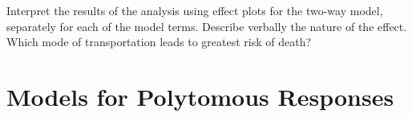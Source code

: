 \documentclass[10pt]{report}\usepackage[]{graphicx}\usepackage[]{color}
\begin{document}
\begin{Exercises}
\begin{enumerate*}
    \item Interpret the results of the analysis using effect plots for the two-way model, separately for each of
    the model terms. Describe verbally the nature of the  effect. 
    Which mode of transportation leads to greatest risk of death?
    \begin{ans}
    \end{ans}
    
  \end{enumerate*}

%   

\end{Exercises}


\clearpage
\chapter[Models for Polytomous Responses]{Models for Polytomous \mbox{Responses}}\label{ch:polytomous}
\end{document}

